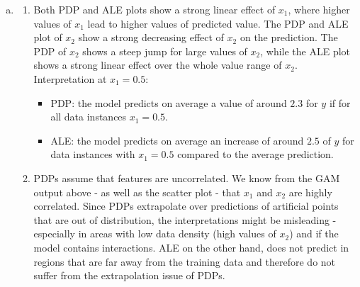 {\begin{enumerate}[a)]
  \item 
  \begin{enumerate}
  \item 
  Both PDP and ALE plots show a strong linear effect of $x_1$, 
  where higher values of $x_1$ lead to higher values of predicted value.
  The PDP and ALE plot of $x_2$ show a strong decreasing effect of $x_2$ on the prediction. 
  The PDP of $x_2$ shows a steep jump for large values of $x_2$, while 
  the ALE plot shows a strong linear effect over the whole value range of $x_2$.
  Interpretation at $x_1 = 0.5$: 
  \begin{itemize}
    \item PDP: the model predicts on average a value of around $2.3$ for $y$ if for all data instances $x_1 = 0.5$.
    \item ALE: the model predicts on average an increase of around $2.5$ of $y$ for data instances with $x_1 = 0.5$ 
    compared to the average prediction.
    \end{itemize}
  \item 
  PDPs assume that features are uncorrelated. We know from the
  GAM output above - as well as the scatter plot - that $x_1$ and $x_2$ are
  highly correlated. Since PDPs extrapolate over predictions of artificial points that 
  are out of distribution, the interpretations might be misleading - especially in areas
  with low data density (high values of $x_2$) and if the model contains interactions.
  ALE on the other hand, does not predict in regions that are far away from the 
  training data and therefore do not suffer from the extrapolation issue of 
  PDPs. 
  \end{enumerate}
\end{enumerate}
}
